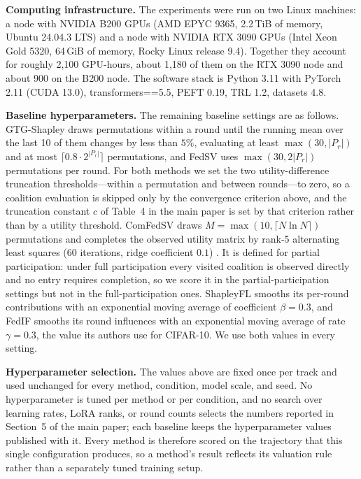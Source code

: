 \documentclass[letterpaper]{article} %
\theoremstyle{plain}
\begin{document}
\textbf{Computing infrastructure.} The experiments were run on two Linux
machines: a node with NVIDIA B200 GPUs (AMD EPYC 9365, 2.2\,TiB of memory,
Ubuntu 24.04.3 LTS) and a node with NVIDIA RTX 3090 GPUs (Intel Xeon Gold
5320, 64\,GiB of memory, Rocky Linux release 9.4). Together they account for roughly 2{,}100
GPU-hours, about 1{,}180 of them on the RTX 3090 node and about 900 on the
B200 node. The software stack is Python 3.11 with PyTorch 2.11 (CUDA 13.0), transformers==5.5, PEFT 0.19, TRL 1.2, datasets 4.8.

\textbf{Baseline hyperparameters.} The remaining baseline settings are as
follows. GTG-Shapley \citep{liu2022gtg} draws permutations within a round
until the running mean over the last 10 of them changes by less than $5\%$,
evaluating at least $\max(30, |P_r|)$ and at most
$\lceil 0.8 \cdot 2^{|P_r|} \rceil$ permutations, and FedSV uses
$\max(30, 2|P_r|)$ permutations per round. For both methods we set the two
utility-difference truncation thresholds---within a permutation and between
rounds---to zero, so a coalition evaluation is skipped only by the convergence
criterion above, and the truncation constant $c$ of Table~4 in the main paper
is set by that criterion rather than by a utility threshold. ComFedSV draws
$M = \max(10, \lceil N \ln N \rceil)$ permutations and completes the observed
utility matrix by rank-5 alternating least squares (60 iterations, ridge
coefficient $0.1$) \citep{fan2022improving}. It is defined for partial
participation: under full participation every visited coalition is observed
directly and no entry requires completion, so we score it in the
partial-participation settings but not in the full-participation ones.
ShapleyFL \citep{sun2023shapleyfl} smooths its per-round contributions with an
exponential moving average of coefficient $\beta{=}0.3$, and FedIF
\citep{tang2025lightweight} smooths its round influences with an exponential
moving average of rate $\gamma{=}0.3$, the value its authors use for CIFAR-10.
We use both values in every setting.

\textbf{Hyperparameter selection.} The values above are fixed once per track
and used unchanged for every method, condition, model scale, and seed. No
hyperparameter is tuned per method or per condition, and no search over
learning rates, LoRA ranks, or round counts selects the numbers reported in
Section~5 of the main paper; each baseline keeps the hyperparameter values
published with it. Every method is therefore scored on the trajectory that
this single configuration produces, so a method's result reflects its
valuation rule rather than a separately tuned training setup.
\end{document}
